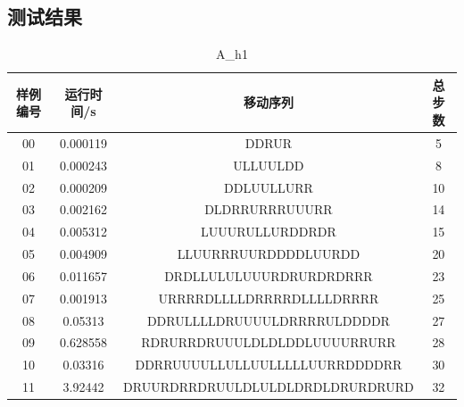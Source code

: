 \documentclass[UTF8]{article}
\begin{document}
    \subsection{测试结果}
    \begin{table}[H]
        \centering
        \caption{A\_h1}
        \begin{tabular}{cccc}
            \hline
            样例编号 & 运行时间/s & 移动序列 & 总步数 \\
            \hline
            00 & 0.000119 & DDRUR & 5  \\
            01 & 0.000243 & ULLUULDD & 8  \\
            02 & 0.000209 & DDLUULLURR & 10  \\
            03 & 0.002162 & DLDRRURRRUUURR & 14  \\
            04 & 0.005312 & LUUURULLURDDRDR & 15  \\
            05 & 0.004909 & LLUURRRUURDDDDLUURDD & 20  \\
            06 & 0.011657 & DRDLLULULUUURDRURDRDRRR & 23  \\
            07 & 0.001913 & URRRRDLLLLDRRRRDLLLLDRRRR & 25  \\
            08 & 0.05313 & DDRULLLLDRUUUULDRRRRULDDDDR & 27  \\
            09 & 0.628558 & RDRURRDRUUULDLDLDDLUUUURRURR & 28  \\
            10 & 0.03316 & DDRRUUUULLULLUULLLLLUURRDDDDRR & 30  \\
            11 & 3.92442 & DRUURDRRDRUULDLULDLDRDLDRURDRURD & 32  \\
            \hline
        \end{tabular}
    \end{table}
\end{document}
